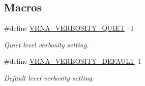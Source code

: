 \subsection*{Macros}
\begin{DoxyCompactItemize}
\item 
\mbox{\label{group__eval_gaf4afe19780b61b4962c613bde324128b}} 
\#define \hyperlink{group__eval_gaf4afe19780b61b4962c613bde324128b}{V\+R\+N\+A\+\_\+\+V\+E\+R\+B\+O\+S\+I\+T\+Y\+\_\+\+Q\+U\+I\+ET}~-\/1
\begin{DoxyCompactList}\small\item\em Quiet level verbosity setting. \end{DoxyCompactList}\item 
\mbox{\label{group__eval_ga47430d9e875084cfb983b22612e3abdf}} 
\#define \hyperlink{group__eval_ga47430d9e875084cfb983b22612e3abdf}{V\+R\+N\+A\+\_\+\+V\+E\+R\+B\+O\+S\+I\+T\+Y\+\_\+\+D\+E\+F\+A\+U\+LT}~1
\begin{DoxyCompactList}\small\item\em Default level verbosity setting. \end{DoxyCompactList}\end{DoxyCompactItemize}
